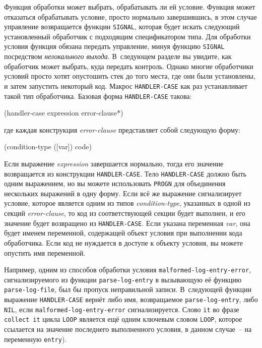 Функция обработки может выбрать, обрабатывать ли ей условие. Функция может отказаться
обрабатывать условие, просто нормально завершившись, в этом случае управление возвращается
функции \lstinline{SIGNAL}, которая будет искать следующий установленный обработчик с
подходящим спецификатором типа. Для обработки условия функция обязана передать управление,
минуя функцию \lstinline{SIGNAL} посредством \textit{нелокального выхода}. В~следующем разделе
вы увидите, как обработчик может выбрать, куда передать контроль. Однако многие
обработчики условий просто хотят опустошить стек до того места, где они были установлены,
и затем запустить некоторый код. Макрос \lstinline{HANDLER-CASE} как раз устанавливает такой
тип обработчика. Базовая форма \lstinline{HANDLER-CASE} такова:

\begin{myverb}
(handler-case expression
  error-clause*)
\end{myverb}

\noindent{}где каждая конструкция \textit{error-clause} представляет собой следующую форму:

\begin{myverb}
(condition-type ([var]) code)
\end{myverb}

Если выражение \textit{expression} завершается нормально, тогда его значение возвращается
из конструкции \lstinline{HANDLER-CASE}. Тело \lstinline{HANDLER-CASE} должно быть одним выражением,
но вы можете использовать \lstinline{PROGN} для объединения нескольких выражений в одну
форму. Если всё же выражение сигнализирует условие, которое является одним из типов
\textit{condition-type}, указанных в одной из секций \textit{error-clause}, то код из
соответствующей секции будет выполнен, и его значение будет возвращено из
\lstinline{HANDLER-CASE}. Если указана переменная \textit{var}, она будет именем переменной,
содержащей объект условия при выполнении кода обработчика. Если код не нуждается в доступе
к объекту условия, вы можете опустить имя переменной.

Например, одним из способов обработки условия \lstinline{malformed-log-entry-error},
сигнализируемого из функции \lstinline{parse-log-entry} в вызывающую её функцию
\lstinline{parse-log-file}, был бы пропуск неправильной записи. В~следующей функции выражение
\lstinline{HANDLER-CASE} вернёт либо имя, возвращаемое \lstinline{parse-log-entry}, либо \lstinline{NIL},
если \lstinline{malformed-log-entry-error} сигнализируется. Слово \lstinline{it} во фразе
\lstinline{collect it} цикла \lstinline{LOOP} является ещё одним ключевым словом \lstinline{LOOP},
которое ссылается на значение последнего выполненного условия, в данном случае~-- на
переменную \lstinline{entry}).

